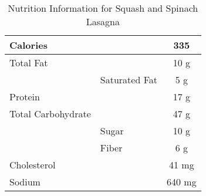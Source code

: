 \begin{table}%
    \centering
    \begin{tabular}{|ll|c|}
        \hline
        Calories & & 335\\
        \hline
        Total Fat & & 10 g\\
        \hline
        & Saturated Fat & 5 g\\
        \hline
        Protein & & 17 g\\
        \hline
        Total Carbohydrate & & 47 g\\
        \hline
        & Sugar & 10 g\\
        \hline
        & Fiber & 6 g\\
        \hline
        Cholesterol & & 41 mg\\
        \hline
        Sodium & & 640 mg\\
        \hline
    \end{tabular}
    \caption{Nutrition Information for Squash and Spinach Lasagna}
\end{table}
